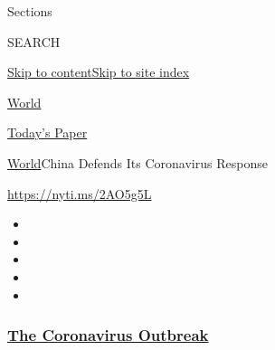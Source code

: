 Sections

SEARCH

\protect\hyperlink{site-content}{Skip to
content}\protect\hyperlink{site-index}{Skip to site index}

\href{https://www.nytimes3xbfgragh.onion/section/world}{World}

\href{https://myaccount.nytimes3xbfgragh.onion/auth/login?response_type=cookie\&client_id=vi}{}

\href{https://www.nytimes3xbfgragh.onion/section/todayspaper}{Today's
Paper}

\href{/section/world}{World}\textbar{}China Defends Its Coronavirus
Response

\url{https://nyti.ms/2AO5g5L}

\begin{itemize}
\item
\item
\item
\item
\item
\end{itemize}

\hypertarget{the-coronavirus-outbreak}{%
\subsubsection{\texorpdfstring{\href{https://www.nytimes3xbfgragh.onion/news-event/coronavirus?name=styln-coronavirus-national\&region=TOP_BANNER\&block=storyline_menu_recirc\&action=click\&pgtype=Article\&impression_id=f5a8c330-f4b4-11ea-8fdc-a33712551175\&variant=undefined}{The
Coronavirus
Outbreak}}{The Coronavirus Outbreak}}\label{the-coronavirus-outbreak}}

